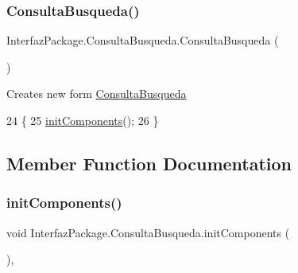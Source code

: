 \subsubsection{\texorpdfstring{Consulta\+Busqueda()}{ConsultaBusqueda()}}
{\footnotesize\ttfamily Interfaz\+Package.\+Consulta\+Busqueda.\+Consulta\+Busqueda (\begin{DoxyParamCaption}{ }\end{DoxyParamCaption})\hspace{0.3cm}{\ttfamily [inline]}}

Creates new form \mbox{\hyperlink{class_interfaz_package_1_1_consulta_busqueda}{Consulta\+Busqueda}} 
\begin{DoxyCode}
24                               \{
25         \mbox{\hyperlink{class_interfaz_package_1_1_consulta_busqueda_a0043eafbbe113b4cca7fc86bba740940}{initComponents}}();
26     \}
\end{DoxyCode}


\subsection{Member Function Documentation}
\mbox{\label{class_interfaz_package_1_1_consulta_busqueda_a0043eafbbe113b4cca7fc86bba740940}} 
\subsubsection{\texorpdfstring{init\+Components()}{initComponents()}}
{\footnotesize\ttfamily void Interfaz\+Package.\+Consulta\+Busqueda.\+init\+Components (\begin{DoxyParamCaption}{ }\end{DoxyParamCaption})\hspace{0.3cm}{\ttfamily [inline]}, {\ttfamily [private]}}

